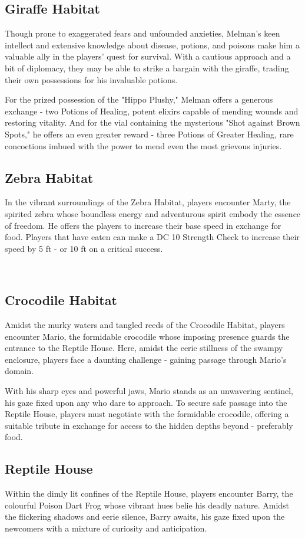 \subsection*{ Giraffe Habitat}
Though prone to exaggerated fears and unfounded anxieties, Melman's keen intellect and extensive knowledge about disease, potions, and poisons make him a valuable ally in the players' quest for survival. With a cautious approach and a bit of diplomacy, they may be able to strike a bargain with the giraffe, trading their own possessions for his invaluable potions.

For the prized possession of the "Hippo Plushy," Melman offers a generous exchange - two Potions of Healing, potent elixirs capable of mending wounds and restoring vitality. And for the vial containing the mysterious "Shot against Brown Spots," he offers an even greater reward - three Potions of Greater Healing, rare concoctions imbued with the power to mend even the most grievous injuries.
\subsection*{ Zebra Habitat}
In the vibrant surroundings of the Zebra Habitat, players encounter Marty, the spirited zebra whose boundless energy and adventurous spirit embody the essence of freedom. He offers the players to increase their base speed in exchange for food. Players that have eaten can make a DC 10 Strength Check to increase their speed by 5 ft - or 10 ft on a critical success.

\hfill\\\eject
\subsection*{ Crocodile Habitat}
Amidst the murky waters and tangled reeds of the Crocodile Habitat, players encounter Mario, the formidable crocodile whose imposing presence guards the entrance to the Reptile House. Here, amidst the eerie stillness of the swampy enclosure, players face a daunting challenge - gaining passage through Mario's domain.

With his sharp eyes and powerful jaws, Mario stands as an unwavering sentinel, his gaze fixed upon any who dare to approach. To secure safe passage into the Reptile House, players must negotiate with the formidable crocodile, offering a suitable tribute in exchange for access to the hidden depths beyond - preferably food.
\subsection*{ Reptile House}
Within the dimly lit confines of the Reptile House, players encounter Barry, the colourful Poison Dart Frog whose vibrant hues belie his deadly nature. Amidst the flickering shadows and eerie silence, Barry awaits, his gaze fixed upon the newcomers with a mixture of curiosity and anticipation.

